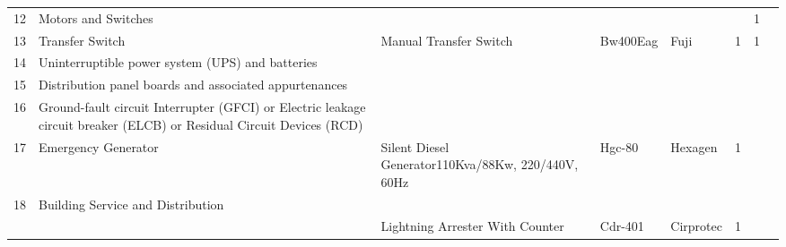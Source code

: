 \begin{table}[!htb]
{{\begin{tabular}{c|p{3.5cm}|p{3.5cm}|p{1.5cm}|p{1.5cm}|c|c|p{1.5cm}}
	12 & Motors and Switches &  &  &  &  & 1 &  \\ 
	13 & Transfer Switch & Manual Transfer Switch & Bw400Eag & Fuji & 1 & 1 &  \\ 
	14 & Uninterruptible power system (UPS) and batteries &  &  &  &  &  &  \\ 
	15 & Distribution panel boards and associated appurtenances &  &  &  &  &  &  \\ 
	16 & Ground-fault circuit Interrupter (GFCI) or Electric leakage circuit breaker (ELCB) or Residual Circuit Devices (RCD) &  &  &  &  &  &  \\ 
	17 & Emergency Generator & Silent Diesel Generator110Kva/88Kw, 220/440V, 60Hz & Hgc-80 & Hexagen & 1 &  &  \\ 
	18 & Building Service and Distribution &  &  &  &  &  &  \\ 
	&  & Lightning Arrester With Counter & Cdr-401 & Cirprotec & 1 &  &  \\ 
	\hline
\end{tabular}

	
	}}
\end{table}



